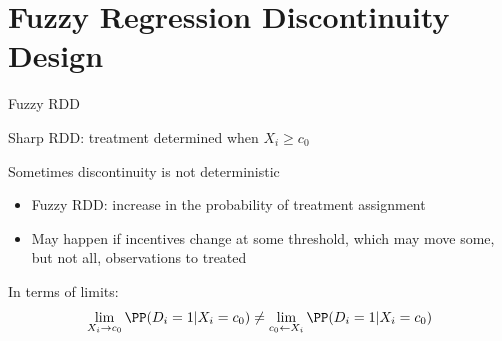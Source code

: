 \documentclass[compress, 8pt]{beamer}
\begin{document}



\section[Fuzzy RDD]{Fuzzy Regression Discontinuity Design}
\miniframesoff
\begin{frame}
    \tableofcontents[currentsection]
\end{frame}
\miniframeson

\begin{frame}{Fuzzy RDD}

Sharp RDD: treatment determined when $X_i \geq c_0$

\vspace{3ex}
Sometimes discontinuity is not deterministic
\begin{itemize}
    \item Fuzzy RDD: increase in the probability of treatment assignment 
    \item May happen if incentives change at some threshold, which may move some, but not all, observations to treated
\end{itemize}

\vspace{3ex}
In terms of limits:
\begin{equation*}
    \lim_{X_i \rightarrow c_0} \PP (D_i = 1 \vert X_i = c_0) \neq 
    \lim_{c_0 \leftarrow X_i} \PP (D_i = 1 \vert X_i = c_0)
\end{equation*}{}



\end{frame}
\end{document}
